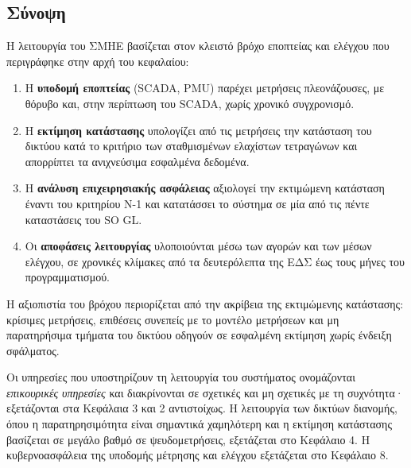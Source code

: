\subsection{Σύνοψη}

Η λειτουργία του ΣΜΗΕ βασίζεται στον κλειστό βρόχο εποπτείας και ελέγχου που περιγράφηκε
στην αρχή του κεφαλαίου:

\begin{enumerate}
\item Η \textbf{υποδομή εποπτείας} (SCADA, PMU) παρέχει μετρήσεις πλεονάζουσες, με θόρυβο
      και, στην περίπτωση του SCADA, χωρίς χρονικό συγχρονισμό.
\item Η \textbf{εκτίμηση κατάστασης} υπολογίζει από τις μετρήσεις την κατάσταση του δικτύου
      κατά το κριτήριο των σταθμισμένων ελαχίστων τετραγώνων και απορρίπτει τα ανιχνεύσιμα
      εσφαλμένα δεδομένα.
\item Η \textbf{ανάλυση επιχειρησιακής ασφάλειας} αξιολογεί την εκτιμώμενη κατάσταση έναντι
      του κριτηρίου N-1 και κατατάσσει το σύστημα σε μία από τις πέντε καταστάσεις του
      SO GL.
\item Οι \textbf{αποφάσεις λειτουργίας} υλοποιούνται μέσω των αγορών και των μέσων ελέγχου,
      σε χρονικές κλίμακες από τα δευτερόλεπτα της ΕΔΣ έως τους μήνες του
      προγραμματισμού.
\end{enumerate}

Η αξιοπιστία του βρόχου περιορίζεται από την ακρίβεια της εκτιμώμενης κατάστασης: κρίσιμες
μετρήσεις, επιθέσεις συνεπείς με το μοντέλο μετρήσεων και μη παρατηρήσιμα τμήματα του
δικτύου οδηγούν σε εσφαλμένη εκτίμηση χωρίς ένδειξη σφάλματος.

Οι υπηρεσίες που υποστηρίζουν τη λειτουργία του συστήματος ονομάζονται \emph{επικουρικές
υπηρεσίες} και διακρίνονται σε σχετικές και μη σχετικές με τη συχνότητα· εξετάζονται στα
Κεφάλαια 3 και 2 αντιστοίχως. Η λειτουργία των δικτύων διανομής, όπου η παρατηρησιμότητα
είναι σημαντικά χαμηλότερη και η εκτίμηση κατάστασης βασίζεται σε μεγάλο βαθμό σε
ψευδομετρήσεις, εξετάζεται στο Κεφάλαιο 4. Η κυβερνοασφάλεια της υποδομής μέτρησης και
ελέγχου εξετάζεται στο Κεφάλαιο 8.
